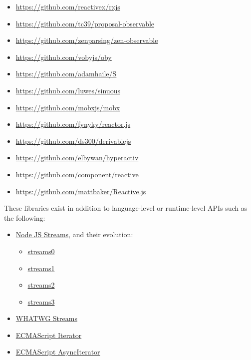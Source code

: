 \documentclass[sigplan,screen,10pt,anonymous,review]{acmart}
\begin{document}
\begin{itemize}
    \item \url{https://github.com/reactivex/rxjs}
    \item \url{https://github.com/tc39/proposal-observable}
    \item \url{https://github.com/zenparsing/zen-observable}
    \item \url{https://github.com/vobyjs/oby}
    \item \url{https://github.com/adamhaile/S}
    \item \url{https://github.com/luwes/sinuous}
    \item \url{https://github.com/mobxjs/mobx}
    \item \url{https://github.com/fynyky/reactor.js}
    \item \url{https://github.com/ds300/derivablejs}
    \item \url{https://github.com/elbywan/hyperactiv}
    \item \url{https://github.com/component/reactive}
    \item \url{https://github.com/mattbaker/Reactive.js}
\end{itemize}

These libraries exist in addition to language-level or runtime-level APIs such as the following:

\begin{itemize}
    \item \href{https://nodejs.org/api/stream.html}{Node JS Streams}, and their evolution: \begin{itemize}
        \item \href{https://nodejs.org/docs/v0.1.100/api.html}{streams0}
        \item \href{https://nodejs.org/docs/v0.4.0/api/streams.html}{streams1}
        \item \href{https://nodejs.org/docs/v0.10.0/api/stream.html}{streams2}
        \item \href{https://nodejs.org/docs/v0.11.5/api/stream.html}{streams3}
    \end{itemize}
    \item \href{https://streams.spec.whatwg.org/}{WHATWG Streams}
    \item \href{https://tc39.es/ecma262/multipage/control-abstraction-objects.html#sec-%iteratorprototype%-object}{ECMAScript Iterator}
    \item \href{https://tc39.es/ecma262/multipage/control-abstraction-objects.html#sec-asynciteratorprototype}{ECMAScript AsyncIterator}
\end{itemize}



\end{document}
